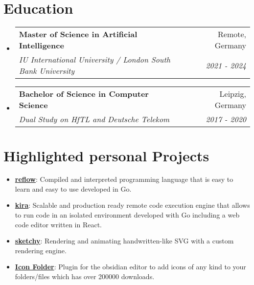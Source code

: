 \documentclass[letterpaper,11pt]{article}
\makeatletter
\newcommand{\resumeItem}[2]{
  \item\small{
    \textbf{#1}{: #2}
  }
}
\newcommand{\resumeSubheading}[4]{
  \vspace{-1pt}\item
    \begin{tabular*}{0.97\textwidth}[t]{l@{\extracolsep{\fill}}r}
      \textbf{#1} & #2 \\
      \textit{\small#3} & \textit{\small #4} \\
    \end{tabular*}
}
\newcommand{\resumeSubItem}[2]{\resumeItem{#1}{#2}}
\newcommand{\resumeSubHeadingListStart}{\begin{itemize}[leftmargin=*]}
\newcommand{\resumeSubHeadingListEnd}{\end{itemize}}
\makeatother
\begin{document}
\section{Education}
  \resumeSubHeadingListStart
    \resumeSubheading
      {Master of Science in Artificial Intelligence}{Remote, Germany}
      {IU International University / London South Bank University}{2021 - 2024}
      \vspace{-10pt}
    \resumeSubheading
      {Bachelor of Science in Computer Science}{Leipzig, Germany}
      {Dual Study on HfTL and Deutsche Telekom}{2017 - 2020}
  \resumeSubHeadingListEnd


\section{Highlighted personal Projects}
  \resumeSubHeadingListStart
    \resumeSubItem{\href{https://github.com/FlorianWoelki/reflow}{reflow}}
      {Compiled and interpreted programming language that is easy to learn and easy to use developed in Go.}
      \vspace{-5pt}
    \resumeSubItem{\href{https://github.com/FlorianWoelki/kira}{kira}}
      {Scalable and production ready remote code execution engine that allows to run code in an isolated environment developed with Go including a web code editor written in React.}
      \vspace{-5pt}
    \resumeSubItem{\href{https://sketchy-virid.vercel.app/}{sketchy}}
      {Rendering and animating handwritten-like SVG with a custom rendering engine.}
      \vspace{-5pt}
    \resumeSubItem{\href{https://github.com/FlorianWoelki/obsidian-icon-folder}{Icon Folder}}
      {Plugin for the obsidian editor to add icons of any kind to your folders/files which has over 200000 downloads.}
      \vspace{-5pt}
  \resumeSubHeadingListEnd
\end{document}
